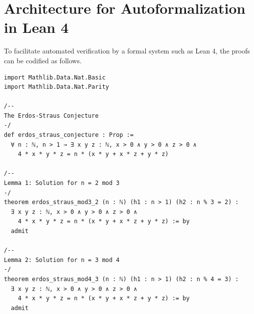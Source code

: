 \documentclass[11pt,a4paper]{article}
\begin{document}
\section{Architecture for Autoformalization in Lean 4}

To facilitate automated verification by a formal system such as Lean 4, the proofs can be codified as follows.

\begin{lstlisting}[basicstyle=\ttfamily\small, breaklines=true]
import Mathlib.Data.Nat.Basic
import Mathlib.Data.Nat.Parity

/--
The Erdos-Straus Conjecture
-/
def erdos_straus_conjecture : Prop :=
  ∀ n : ℕ, n > 1 → ∃ x y z : ℕ, x > 0 ∧ y > 0 ∧ z > 0 ∧
    4 * x * y * z = n * (x * y + x * z + y * z)

/--
Lemma 1: Solution for n = 2 mod 3
-/
theorem erdos_straus_mod3_2 (n : ℕ) (h1 : n > 1) (h2 : n % 3 = 2) :
  ∃ x y z : ℕ, x > 0 ∧ y > 0 ∧ z > 0 ∧
    4 * x * y * z = n * (x * y + x * z + y * z) := by
  admit

/--
Lemma 2: Solution for n = 3 mod 4
-/
theorem erdos_straus_mod4_3 (n : ℕ) (h1 : n > 1) (h2 : n % 4 = 3) :
  ∃ x y z : ℕ, x > 0 ∧ y > 0 ∧ z > 0 ∧
    4 * x * y * z = n * (x * y + x * z + y * z) := by
  admit
\end{lstlisting}
\end{document}
